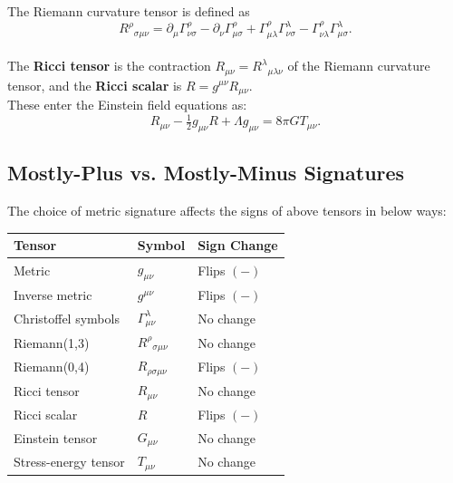 The Riemann curvature tensor is defined as
\begin{equation}
  R^\rho{}_{\sigma\mu\nu} = \partial_\mu \Gamma^\rho_{\nu\sigma} - \partial_\nu \Gamma^\rho_{\mu\sigma} + \Gamma^\rho_{\mu\lambda}\Gamma^\lambda_{\nu\sigma} - \Gamma^\rho_{\nu\lambda}\Gamma^\lambda_{\mu\sigma}.
\end{equation} \\

The \textbf{Ricci tensor} is the contraction $R_{\mu\nu} = R^\lambda{}_{\mu\lambda\nu}$
of the Riemann curvature tensor, and the \textbf{Ricci scalar} is $R = g^{\mu\nu}R_{\mu\nu}$. \\

These enter the Einstein field equations as:
\begin{equation}
  R_{\mu\nu} - \tfrac{1}{2}g_{\mu\nu}R + \Lambda g_{\mu\nu} = 8\pi G T_{\mu\nu}.
\end{equation}

\subsection*{Mostly-Plus vs. Mostly-Minus Signatures}
The choice of metric signature affects the signs of above tensors in below ways:
\begin{center}
      \begin{tabular}{@{}lll@{}}
      \toprule
      \textbf{Tensor} & \textbf{Symbol} & \textbf{Sign Change} \\
      \midrule
      Metric& $g_{\mu\nu}$ & Flips $(-)$ \\
      Inverse metric & $g^{\mu\nu}$ & Flips $(-)$ \\
      Christoffel symbols & $\Gamma^\lambda_{\mu\nu}$ & No change \\
      Riemann(1,3) & $R^\rho{}_{\sigma\mu\nu}$ & No change \\
      Riemann(0,4) & $R_{\rho\sigma\mu\nu}$ & Flips $(-)$ \\
      Ricci tensor & $R_{\mu\nu}$ & No change \\
      Ricci scalar & $R$ & Flips $(-)$ \\
      Einstein tensor & $G_{\mu\nu}$ & No change \\
      Stress-energy tensor & $T_{\mu\nu}$ & No change \\
      \bottomrule
      \end{tabular}
\end{center}

\bigskip\noindent
